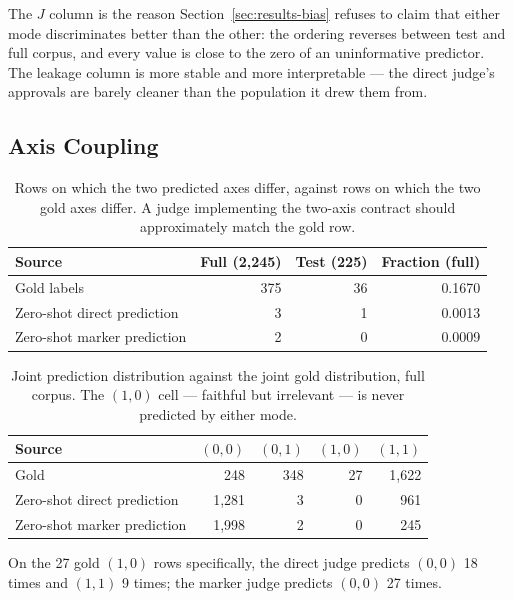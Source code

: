 \documentclass{zapiski}
\begin{document}
The $J$ column is the reason Section~\ref{sec:results-bias} refuses to claim
that either mode discriminates better than the other: the ordering reverses
between test and full corpus, and every value is close to the zero of an
uninformative predictor. The leakage column is more stable and more
interpretable --- the direct judge's approvals are barely cleaner than the
population it drew them from.

\subsection{Axis Coupling}
\label{sec:appendix-coupling}

\begin{table}[H]
\centering
\caption{Rows on which the two predicted axes differ, against rows on which
the two gold axes differ. A judge implementing the two-axis contract should
approximately match the gold row.}
\label{tab:axis-coupling}
\begin{tabular}{lrrr}
\toprule
Source & Full (2,245) & Test (225) & Fraction (full) \\
\midrule
Gold labels                 & 375 & 36 & 0.1670 \\
Zero-shot direct prediction &   3 &  1 & 0.0013 \\
Zero-shot marker prediction &   2 &  0 & 0.0009 \\
\bottomrule
\end{tabular}
\end{table}

\begin{table}[H]
\centering
\caption{Joint prediction distribution against the joint gold distribution,
full corpus. The $(1,0)$ cell --- faithful but irrelevant --- is never
predicted by either mode.}
\label{tab:joint-predictions}
\footnotesize
\begin{tabular}{lrrrr}
\toprule
Source & $(0,0)$ & $(0,1)$ & $(1,0)$ & $(1,1)$ \\
\midrule
Gold                        &   248 & 348 & 27 & 1{,}622 \\
Zero-shot direct prediction & 1{,}281 &   3 &  0 &   961 \\
Zero-shot marker prediction & 1{,}998 &   2 &  0 &   245 \\
\bottomrule
\end{tabular}
\end{table}

On the 27 gold $(1,0)$ rows specifically, the direct judge predicts $(0,0)$
18 times and $(1,1)$ 9 times; the marker judge predicts $(0,0)$ 27 times.
\end{document}
